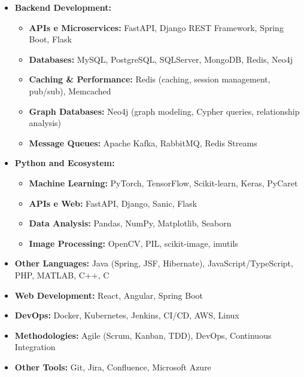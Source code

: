 \documentclass[12pt,a4paper,sans]{moderncv}        %
\begin{document}
\begin{itemize}

\item \textbf{Backend Development:}
  \begin{itemize}
    \item \textbf{APIs e Microservices:} FastAPI, Django REST Framework, Spring Boot, Flask
    \item \textbf{Databases:} MySQL, PostgreSQL, SQLServer, MongoDB, Redis, Neo4j
    \item \textbf{Caching \& Performance:} Redis (caching, session management, pub/sub), Memcached
    \item \textbf{Graph Databases:} Neo4j (graph modeling, Cypher queries, relationship analysis)
    \item \textbf{Message Queues:} Apache Kafka, RabbitMQ, Redis Streams
  \end{itemize}
\vspace{2pt}

\item \textbf{Python and Ecosystem:}
  \begin{itemize}
    \item \textbf{Machine Learning:} PyTorch, TensorFlow, Scikit-learn, Keras, PyCaret
    \item \textbf{APIs e Web:} FastAPI, Django, Sanic, Flask
    \item \textbf{Data Analysis:} Pandas, NumPy, Matplotlib, Seaborn
    \item \textbf{Image Processing:} OpenCV, PIL, scikit-image, imutils
  \end{itemize}
\vspace{2pt}

\item \textbf{Other Languages:} Java (Spring, JSF, Hibernate), JavaScript/TypeScript, PHP, MATLAB, C++, C
\vspace{2pt}
\item \textbf{Web Development:} React, Angular, Spring Boot
\vspace{2pt}
\item \textbf{DevOps:} Docker, Kubernetes, Jenkins, CI/CD, AWS, Linux
\vspace{2pt}
\item \textbf{Methodologies:} Agile (Scrum, Kanban, TDD), DevOps, Continuous Integration
\vspace{2pt}
\item \textbf{Other Tools:} Git, Jira, Confluence, Microsoft Azure

\end{itemize}
\end{document}
